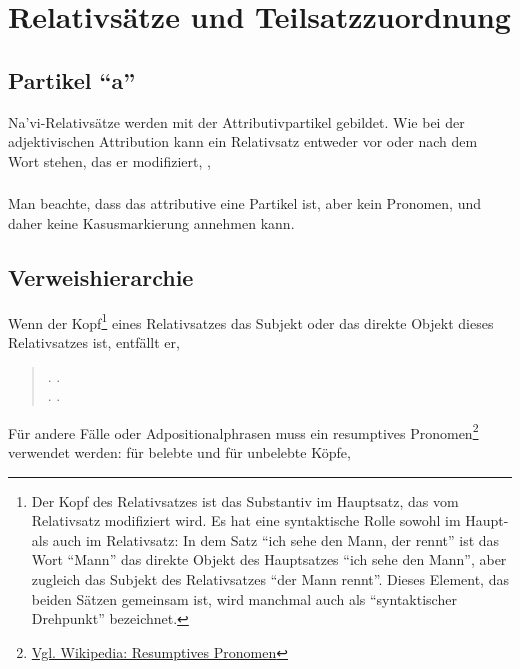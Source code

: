 \section{Relativsätze und Teilsatzzuordnung}
\subsection{Partikel ``a''} Na'vi-Relativsätze werden mit der Attributivpartikel  gebildet.\label{syn:a} Wie bei der adjektivischen Attribution kann ein Relativsatz entweder vor oder nach dem Wort stehen, das er modifiziert,  ,  

\subsubsection{} Man beachte, dass das attributive  eine Partikel ist, aber kein Pronomen, und daher keine Kasusmarkierung annehmen kann.

\subsection{Verweishierarchie} Wenn der Kopf\footnote{Der Kopf des Relativsatzes ist das Substantiv im Hauptsatz, das vom Relativsatz modifiziert wird. Es hat eine syntaktische Rolle sowohl im Haupt- als auch im Relativsatz: In dem Satz ``ich sehe den Mann, der rennt'' ist das Wort ``Mann'' das direkte Objekt des Hauptsatzes ``ich sehe den Mann'', aber zugleich das Subjekt des Relativsatzes ``der Mann rennt''. Dieses Element, das beiden Sätzen gemeinsam ist, wird manchmal auch als ``syntaktischer Drehpunkt'' bezeichnet.} eines Relativsatzes das Subjekt oder das direkte Objekt dieses Relativsatzes ist, entfällt er,

\begin{quotation}
	\noindent {}.
	.\\
	\noindent {}.
	. 
\end{quotation}
\noindent Für andere Fälle oder Adpositionalphrasen muss ein resumptives Pronomen\footnote{\href{https://de.wikipedia.org/wiki/Resumptives_Pronomen}{Vgl. Wikipedia: Resumptives Pronomen}} verwendet werden:  für belebte und  für unbelebte Köpfe,

